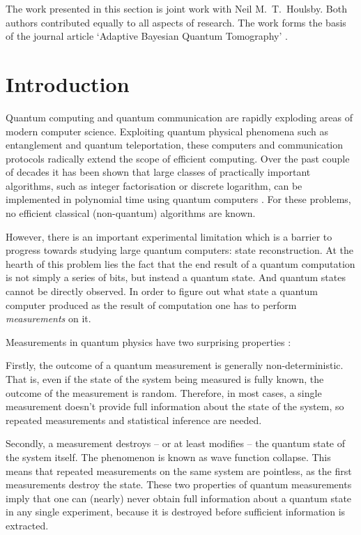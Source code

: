
\begin{summarycontributions}
 The work presented in this section is joint work with Neil M.\ T.\ Houlsby. Both authors contributed equally to all aspects of research. The work forms the basis of the journal article `Adaptive Bayesian Quantum Tomography' \citep{Huszar2012}.
\end{summarycontributions}


\section{Introduction}

Quantum computing and quantum communication are rapidly exploding areas of modern computer science. Exploiting quantum physical phenomena such as entanglement and quantum teleportation, these computers and communication protocols radically extend the scope of efficient computing. Over the past couple of decades it has been shown that large classes of practically important algorithms, such as integer factorisation or discrete logarithm, can be implemented in polynomial time using quantum computers \citep{Shor1994,Shor1997}. For these problems, no efficient classical (non-quantum) algorithms are known.

However, there is an important experimental limitation which is a barrier to progress towards studying large quantum computers: state reconstruction. At the hearth of this problem lies the fact that the end result of a quantum computation is not simply a series of bits, but instead a quantum state. And quantum states cannot be directly observed. In order to figure out what state a quantum computer produced as the result of computation one has to perform \emph{measurements} on it.

Measurements in quantum physics have two surprising properties	:

Firstly, the outcome of a quantum measurement is generally non-deterministic. That is, even if the state of the system being measured is fully known, the outcome of the measurement is random. Therefore, in most cases, a single measurement doesn't provide full information about the state of the system, so repeated measurements and statistical inference are needed.

Secondly, a measurement destroys -- or at least modifies -- the quantum state of the system itself. The phenomenon is known as wave function collapse. This means that repeated measurements on the same system are pointless, as the first measurements destroy the state. These two properties of quantum measurements imply that one can (nearly) never obtain full information about a quantum state in any single experiment, because it is destroyed before sufficient information is extracted.

